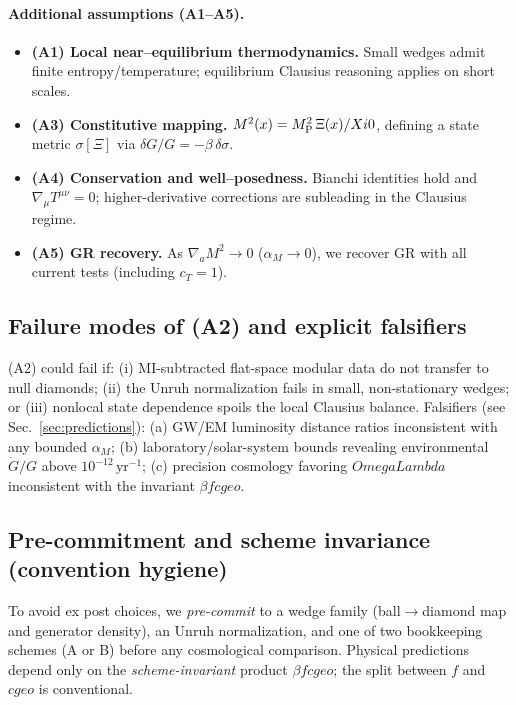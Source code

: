 \documentclass[aps,prd,onecolumn,superscriptaddress,nofootinbib]{revtex4-2}
\def\OmL{OmegaLambda}%
\def\cgeo{cgeo}%
\def\XiVac{Xi0}%
\newcommand{\OmL}{\Omega_\Lambda}
\newcommand{\cgeo}{c_{\rm geo}}
\newcommand{\XiVac}{\Xi_0}
\begin{document}
\paragraph{Additional assumptions (A1–A5).}
\begin{itemize}[leftmargin=1.3em]
\item \textbf{(A1) Local near–equilibrium thermodynamics.} Small wedges admit finite entropy/temperature; equilibrium Clausius reasoning applies on short scales.
\item \textbf{(A3) Constitutive mapping.} \(M^2(x)=M_{\rm P}^2\,\Xi(x)/\XiVac\), defining a state metric \(\sigma[\Xi]\) via \(\delta G/G=-\beta\,\delta\sigma\).
\item \textbf{(A4) Conservation and well–posedness.} Bianchi identities hold and \(\nabla_\mu T^{\mu\nu}=0\); higher-derivative corrections are subleading in the Clausius regime.
\item \textbf{(A5) GR recovery.} As \(\nabla_a M^2\!\to\!0\) (\(\alpha_M\!\to\!0\)), we recover GR with all current tests (including \(c_T=1\)).
\end{itemize}

\subsection{Failure modes of (A2) and explicit falsifiers}
\label{sec:a2-fail}
(A2) could fail if: (i) MI-subtracted flat-space modular data do not transfer to null diamonds; (ii) the Unruh normalization fails in small, non-stationary wedges; or (iii) nonlocal state dependence spoils the local Clausius balance. Falsifiers (see Sec.~\ref{sec:predictions}): (a) GW/EM luminosity distance ratios inconsistent with any bounded \(\alpha_M\); (b) laboratory/solar-system bounds revealing environmental \(\dot G/G\) above \(10^{-12}\,\text{yr}^{-1}\); (c) precision cosmology favoring \(\OmL\) inconsistent with the invariant \(\beta f \cgeo\).

\subsection{Pre-commitment and scheme invariance (convention hygiene)}
\label{sec:precommit}
To avoid ex post choices, we \emph{pre-commit} to a wedge family (ball\(\to\)diamond map and generator density), an Unruh normalization, and one of two bookkeeping schemes (A or B) before any cosmological comparison. Physical predictions depend only on the \emph{scheme-invariant} product \(\beta f \cgeo\); the split between \(f\) and \(\cgeo\) is conventional.
\end{document}

